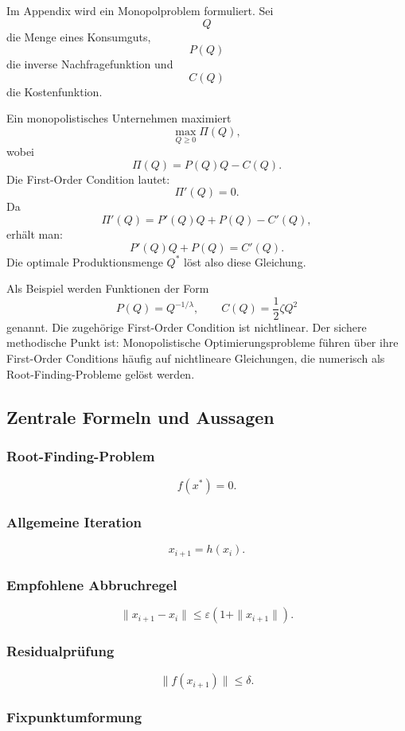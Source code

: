 \documentclass[10pt, letterpaper]{article}
\begin{document}
Im Appendix wird ein Monopolproblem formuliert. Sei
\[
Q
\]
die Menge eines Konsumguts,
\[
P(Q)
\]
die inverse Nachfragefunktion und
\[
C(Q)
\]
die Kostenfunktion.

Ein monopolistisches Unternehmen maximiert
\[
\max_{Q\geq 0}\Pi(Q),
\]
wobei
\[
\Pi(Q)=P(Q)Q-C(Q).
\]
Die First-Order Condition lautet:
\[
\Pi'(Q)=0.
\]
Da
\[
\Pi'(Q)=P'(Q)Q+P(Q)-C'(Q),
\]
erhält man:
\[
\boxed{
P'(Q)Q+P(Q)=C'(Q).
}
\]
Die optimale Produktionsmenge \(Q^\ast\) löst also diese Gleichung.

Als Beispiel werden Funktionen der Form
\[
P(Q)=Q^{-1/\lambda},
\qquad
C(Q)=\frac12\zeta Q^2
\]
genannt. Die zugehörige First-Order Condition ist nichtlinear. Der sichere methodische Punkt ist: Monopolistische Optimierungsprobleme führen über ihre First-Order Conditions häufig auf nichtlineare Gleichungen, die numerisch als Root-Finding-Probleme gelöst werden.

\subsection{Zentrale Formeln und Aussagen}

\subsubsection{Root-Finding-Problem}

\[
\boxed{
f(x^\ast)=0.
}
\]

\subsubsection{Allgemeine Iteration}

\[
\boxed{
x_{i+1}=h(x_i).
}
\]

\subsubsection{Empfohlene Abbruchregel}

\[
\boxed{
\|x_{i+1}-x_i\|
\leq
\varepsilon(1+\|x_{i+1}\|).
}
\]

\subsubsection{Residualprüfung}

\[
\boxed{
\|f(x_{i+1})\|\leq \delta.
}
\]

\subsubsection{Fixpunktumformung}
\end{document}
